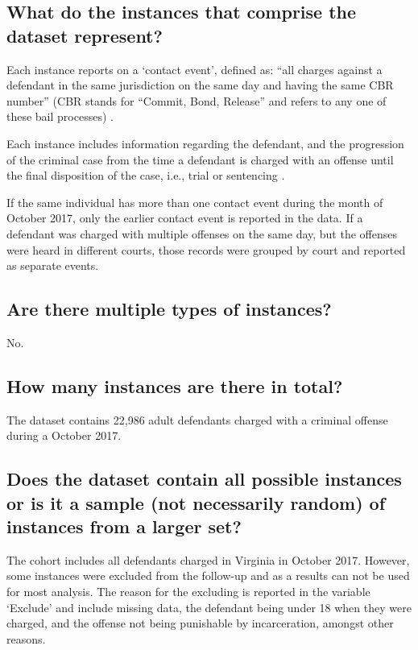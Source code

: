 \documentclass[letterpaper, 10 pt, conference]{ieeeconf}  %
\begin{document}
\subsection{What do the instances that comprise the dataset represent?}

Each instance reports on a `contact event', defined as: ``all charges against a defendant in the same jurisdiction on the same day and having the same CBR number'' (CBR stands for “Commit, Bond, Release” and refers to any one of these bail processes) \cite{codebook}.

Each instance includes information regarding the defendant, and the progression of the criminal case from the time a defendant is charged with an offense until
the final disposition of the case, i.e., trial or sentencing \cite{codebook}.

If the same individual has more than one contact event during the month of October 2017, only the earlier contact event is reported in the data. If a defendant was charged with multiple offenses on the same day, but the offenses were heard in
different courts, those records were grouped by court and reported as separate events.

\subsection{Are there multiple types of instances?}

No.

\subsection{How many instances are there in total?}

The dataset contains 22,986 adult defendants charged with a criminal offense during a October 2017.

\subsection{Does the dataset contain all possible instances or is it a sample (not necessarily random) of instances from a larger set?}

The cohort includes all defendants charged in Virginia in October 2017. However, some instances were excluded from the follow-up and as a results can not be used for most analysis. The reason for the excluding is reported in the variable `Exclude' and include missing data, the defendant being under 18 when they were charged, and the offense not being punishable by incarceration, amongst other reasons. 
\end{document}

